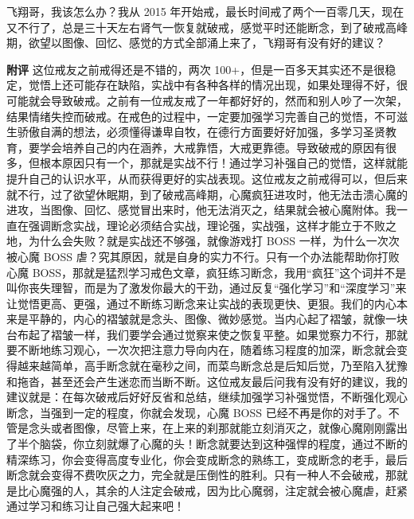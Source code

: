 \begin{case}
    飞翔哥，我该怎么办？我从 2015 年开始戒，最长时间戒了两个一百零几天，现在又不行了，总是三十天左右肾气一恢复就破戒，感觉平时还能断念，到了破戒高峰期，欲望以图像、回忆、感觉的方式全部涌上来了，飞翔哥有没有好的建议？

    \textbf{附评} 这位戒友之前戒得还是不错的，两次 100+，但是一百多天其实还不是很稳定，觉悟上还可能存在缺陷，实战中有各种各样的情况出现，如果处理得不好，很可能就会导致破戒。之前有一位戒友戒了一年都好好的，然而和别人吵了一次架，结果情绪失控而破戒。在戒色的过程中，一定要加强学习完善自己的觉悟，不可滋生骄傲自满的想法，必须懂得谦卑自牧，在德行方面要好好加强，多学习圣贤教育，要学会培养自己的内在涵养，大戒靠悟，大戒更靠德。导致破戒的原因有很多，但根本原因只有一个，那就是实战不行！通过学习补强自己的觉悟，这样就能提升自己的认识水平，从而获得更好的实战表现。这位戒友之前戒得可以，但后来就不行，过了欲望休眠期，到了破戒高峰期，心魔疯狂进攻时，他无法击溃心魔的进攻，当图像、回忆、感觉冒出来时，他无法消灭之，结果就会被心魔附体。我一直在强调断念实战，理论必须结合实战，理论强，实战强，这样才能立于不败之地，为什么会失败？就是实战还不够强，就像游戏打 BOSS 一样，为什么一次次被心魔 BOSS 虐？究其原因，就是自身的实力不行。只有一个办法能帮助你打败心魔 BOSS，那就是猛烈学习戒色文章，疯狂练习断念，我用“疯狂”这个词并不是叫你丧失理智，而是为了激发你最大的干劲，通过反复“强化学习”和“深度学习”来让觉悟更高、更强，通过不断练习断念来让实战的表现更快、更狠。我们的内心本来是平静的，内心的褶皱就是念头、图像、微妙感觉。当内心起了褶皱，就像一块台布起了褶皱一样，我们要学会通过觉察来使之恢复平整。如果觉察力不行，那就要不断地练习观心，一次次把注意力导向内在，随着练习程度的加深，断念就会变得越来越简单，高手断念就在毫秒之间，而菜鸟断念总是后知后觉，乃至陷入犹豫和拖沓，甚至还会产生迷恋而当断不断。这位戒友最后问我有没有好的建议，我的建议就是：在每次破戒后好好反省和总结，继续加强学习补强觉悟，不断强化观心断念，当强到一定的程度，你就会发现，心魔 BOSS 已经不再是你的对手了。不管是念头或者图像，尽管上来，在上来的刹那就能立刻消灭之，就像心魔刚刚露出了半个脑袋，你立刻就爆了心魔的头！断念就要达到这种强悍的程度，通过不断的精深练习，你会变得高度专业化，你会变成断念的熟练工，变成断念的老手，最后断念就会变得不费吹灰之力，完全就是压倒性的胜利。只有一种人不会破戒，那就是比心魔强的人，其余的人注定会破戒，因为比心魔弱，注定就会被心魔虐，赶紧通过学习和练习让自己强大起来吧！
\end{case}

